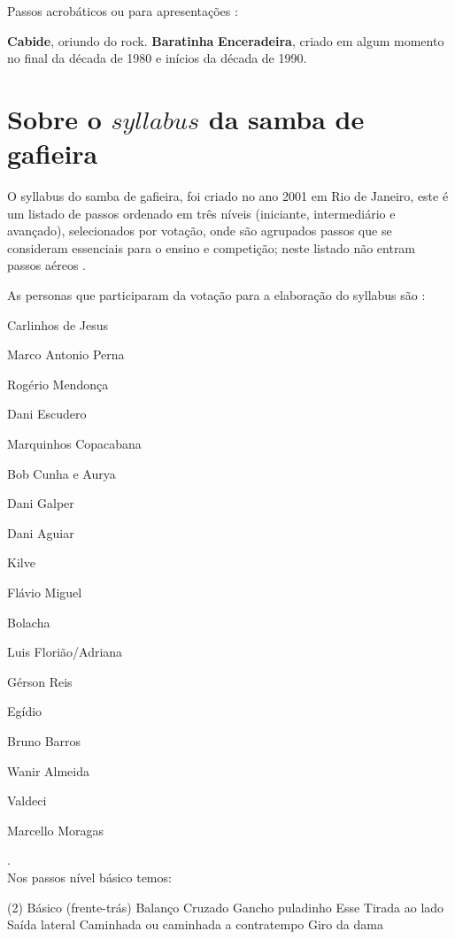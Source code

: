 Passos acrobáticos ou para apresentações \cite[pp. 142-143]{perna2002samba}:
\begin{tasks}
\task \textbf{Cabide}, oriundo do rock.
\task \textbf{Baratinha}
\task \textbf{Enceradeira}, criado em algum momento no final da década de 1980 e inícios da década de 1990.
\end{tasks}


\section{Sobre o $syllabus$ da samba de gafieira}

O syllabus  do samba de gafieira, foi criado no ano 2001 em Rio de Janeiro,
este é um listado de passos ordenado em três níveis (iniciante, intermediário e avançado),
selecionados por votação,
onde são agrupados passos que se consideram essenciais para o ensino e competição;
neste listado não entram passos aéreos \cite[pp. 144]{perna2002samba}.


As personas que participaram da votação para a elaboração do syllabus são \cite[pp. 144]{perna2002samba}:
\begin{inparaitem}[$\circ$]
\item Carlinhos de Jesus
\item Marco Antonio Perna
\item Rogério Mendonça
\item Dani Escudero
\item Marquinhos Copacabana
\item Bob Cunha e Aurya
\item Dani Galper
\item Dani Aguiar
\item Kilve
\item Flávio Miguel
\item Bolacha
\item Luis Florião/Adriana
\item Gérson Reis
\item Egídio
\item Bruno Barros
\item Wanir Almeida
\item Valdeci
\item Marcello Moragas
\end{inparaitem}.\\



Nos passos nível básico temos:
\begin{tasks}(2)
\task Básico (frente-trás)
\task Balanço 
\task Cruzado
\task Gancho
\task puladinho
\task Esse
\task Tirada ao lado
\task Saída lateral
\task Caminhada ou caminhada a contratempo
\task Giro da dama
\end{tasks}~\\


